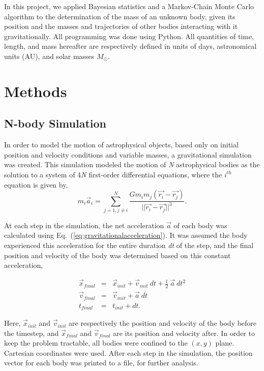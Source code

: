 \documentclass[twocolumn]{aastex63}
\newcommand{\msun}{M_\odot}
\begin{document}
In this project, we applied Bayesian statistics and a Markov-Chain Monte Carlo algorithm to the determination of the mass of an unknown body, given its position and the masses and trajectories of other bodies interacting with it gravitationally. All programming was done using Python. All quantities of time, length, and mass hereafter are respectively defined in units of days, astronomical units (AU), and solar masses $\msun$.

\section{Methods} \label{sec:methods}


\subsection{N-body Simulation} \label{ssec:simulation} %

In order to model the motion of astrophysical objects, based only on initial position and velocity conditions and variable masses, a gravitational simulation was created. This simulation modeled the motion of \textit{N} astrophysical bodies as the solution to a system of 4\textit{N} first-order differential equations, where the $i^{th}$ equation is given by,
\begin{equation}\label{eq:gravitationalacceleration}
    m_i\vec{a}_i = \sum^N_{j=1, j\neq i} \frac{Gm_im_j(\vec{r_i} - \vec{r_j})}{||\vec{r_i} - \vec{r_j}||^3}.
\end{equation}{}

At each step in the simulation, the net acceleration $\vec{a}$ of each body was calculated using Eq.~(\ref{eq:gravitationalacceleration}). It was assumed the body experienced this acceleration for the entire duration \textit{dt} of the step, and the final position and velocity of the body was determined based on this constant acceleration,

\begin{eqnarray}\label{eq:simulationevolution}
    \vec{x}_{final} &=& \vec{x}_{init} + \vec{v}_{init}\  dt + \frac{1}{2}\ \vec{a}\ dt^2 \nonumber \\
    \vec{v}_{final} &=& \vec{v}_{init} + \vec{a}\ dt \\
    t_{final} &=& t_{init} + dt. \nonumber
\end{eqnarray}{}

\noindent Here, $\vec{x}_{init}$ and $\vec{v}_{init}$ are respectively the position and velocity of the body before the timestep, and $\vec{x}_{final}$ and $\vec{v}_{final}$ are its position and velocity after. In order to keep the problem tractable, all bodies were confined to the $(x,y)$ plane. Cartesian coordinates were used. After each step in the simulation, the position vector for each body was printed to a file, for further analysis. 
\end{document}
